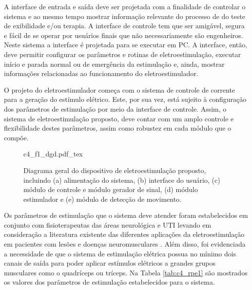 A interface de entrada e saída deve ser projetada com a finalidade de controlar o sistema e ao mesmo tempo mostrar informação relevante do processo de do teste de exibilidade e/ou terapia. A interface de controle tem que ser amigável, segura e fácil de se operar por usuários finais que não necessariamente são engenheiros. Neste sistema a interface é projetada para se executar em \acrshort{PC}. A interface, então, deve permitir configurar os parâmetros e rotinas de eletroestimulação, executar início e parada normal ou de emergência da estimulação e, ainda, mostrar informações relacionadas ao funcionamento do eletroestimulador.

O projeto do eletroestimulador começa com o sistema de controle de corrente para a geração do estímulo elétrico. Este, por sua vez, está sujeito à configuração dos parâmetros de estimulação por meio da interface de controle. Assim, o sistema de eletroestimulação proposto, deve contar com um amplo controle e flexibilidade destes parâmetros, assim como robustez em cada módulo que o compõe.

\newpage

\begin{figure}
    \centering %
    \small %
    \def\svgwidth{0.9\columnwidth}%
    {c4_f1_dgd.pdf_tex}
    \caption{Diagrama geral do dispositivo de eletroestimulação proposto, incluindo (a) alimentação do sistema, (b) interface do usuário, (c) módulo de controle e módulo gerador de sinal, (d) módulo estimulador e (e) módulo de detecção de movimento.}
    \label{fig:c4_f1_dgd}
\end{figure}

Os parâmetros de estimulação que o sistema deve atender foram estabelecidos em conjunto com fisioterapeutas das áreas neurológica e \acrshort{UTI} levando em consideração a literatura existente das diferentes aplicações da eletroestimulação em pacientes com lesões e doenças neuromusculares \cite{Silva2016, Carolina2016}. Além disso, foi evidenciada a necessidade de que o sistema de estimulação elétrica possua no mínimo dois canais de saída para poder aplicar estímulos elétricos a  grandes grupos musculares como o quadríceps ou tríceps. Na Tabela \ref{tab:c4_rpe1} são mostrados os valores dos parâmetros de estimulação estabelecidos para o sistema.


